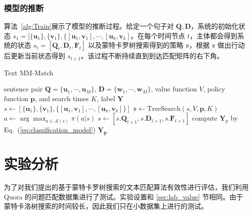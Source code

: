 \subsubsection{模型的推断}
算法~\ref{alg:Train}展示了模型的推断过程。给定一个句子对 $\mathbf{Q}, \mathbf{D}$，系统的初始化状态 $s_1=[\{\mathbf{u}_1\}, \{\mathbf{v}_1\}, \{[\mathbf{u}_1,\mathbf{v}_1], \cdots, [\mathbf{u}_k, \mathbf{v}_k]$。在每个时间节点 $t$，主体都会得到系统的状态 $s_t=[\mathbf{Q}_t, \mathbf{D}_t, \mathbf{F}_t]$ 以及蒙特卡罗树搜索得到的策略 $\mathbb{\pi}$，根据 $\mathbb{\pi}$ 做出行动后更新当前状态得到 $s_{t+1}$。该过程不断持续直到到达匹配矩阵的右下角。

\begin{algorithm}[!htbp]
\caption{Text MM-Match}\label{alg:RLRank_MCTS}
\renewcommand{\algorithmicrequire}{\textbf{Input:}}
\renewcommand{\algorithmicensure}{\textbf{Output:}}
\begin{algorithmic}[1]
\Require sentence pair $\mathbf{Q}=\{\mathbf{u}_1, \cdots, \mathbf{u}_M\}$, $\mathbf{D}=\{\mathbf{w}_1, \cdots, \mathbf{w}_M\}$, value function $V$, policy function $\mathbf{p}$, and search times $K$,
\Ensure label $\mathbf{Y}$
\State $s \leftarrow [\{\mathbf{u}_1\}, \{\mathbf{v}_1\}, \{[\mathbf{u}_1,\mathbf{v}_1], \cdots, [\mathbf{u}_k, \mathbf{v}_k]\}]$
  \State $\mathbb{\pi} \leftarrow \mathrm{TreeSearch}(s, V, \mathbf{p}, K)$
  \State $a \leftarrow \arg\max_{a\in\mathcal{A}(s)} \pi(a|s)$
  \State $s \leftarrow [s.\mathbf{Q}_{t+1}, s.\mathbf{D}_{t+1}, s.\mathbf{F}_{t+1}]$
\EndWhile
\State compute $\mathbf{Y}_p$ by Eq.~(\ref{eq:classification_model})
\State \Return $\mathbf{Y_p}$
\end{algorithmic}
\end{algorithm}


\section{实验分析}
为了对我们提出的基于蒙特卡罗树搜索的文本匹配算法有效性进行评估，我们利用 Quora 的问题匹配数据集进行了测试。实验设置和 \ref{sec:lab_value} 节相同。由于蒙特卡洛树搜索的时间较长，因此我们只在小数据集上进行的测试。

